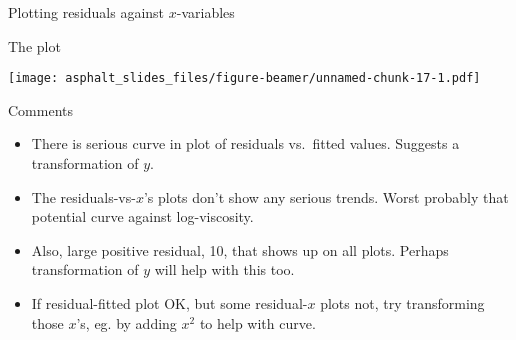\begin{frame}[fragile]{Plotting residuals against \(x\)-variables}
\protect\hypertarget{plotting-residuals-against-x-variables-1}{}
\begin{Shaded}
\begin{Highlighting}[]
\OperatorTok{\%\textgreater{}\%}
\StringTok{  }\NormalTok{(}\OperatorTok{\%\textgreater{}\%}\StringTok{ }
\StringTok{  }\NormalTok{(}
    \OperatorTok{:}
    \NormalTok{, }
\NormalTok{  ) }\OperatorTok{\%\textgreater{}\%}
\StringTok{  }\NormalTok{(}\NormalTok{(}\OperatorTok{+}
\StringTok{  }\NormalTok{() }\OperatorTok{+}\StringTok{ }\NormalTok{(}\OperatorTok{\textasciitilde{}} \NormalTok{) {-}\textgreater{}}\StringTok{ }
\end{Highlighting}
\end{Shaded}
\end{frame}

\begin{frame}[fragile]{The plot}
\protect\hypertarget{the-plot-1}{}
\begin{Shaded}
\begin{Highlighting}[]
\end{Highlighting}
\end{Shaded}

\texttt{[image: asphalt\_slides\_files/figure-beamer/unnamed-chunk-17-1.pdf]}
\end{frame}

\begin{frame}{Comments}
\protect\hypertarget{comments-1}{}
\begin{itemize}
\tightlist
\item
  There is serious curve in plot of residuals vs.~fitted values.
  Suggests a transformation of \(y\).
\item
  The residuals-vs-\(x\)'s plots don't show any serious trends. Worst
  probably that potential curve against log-viscosity.
\item
  Also, large positive residual, 10, that shows up on all plots. Perhaps
  transformation of \(y\) will help with this too.
\item
  If residual-fitted plot OK, but some residual-\(x\) plots not, try
  transforming those \(x\)'s, eg. by adding \(x^2\) to help with curve.
\end{itemize}
\end{frame}

